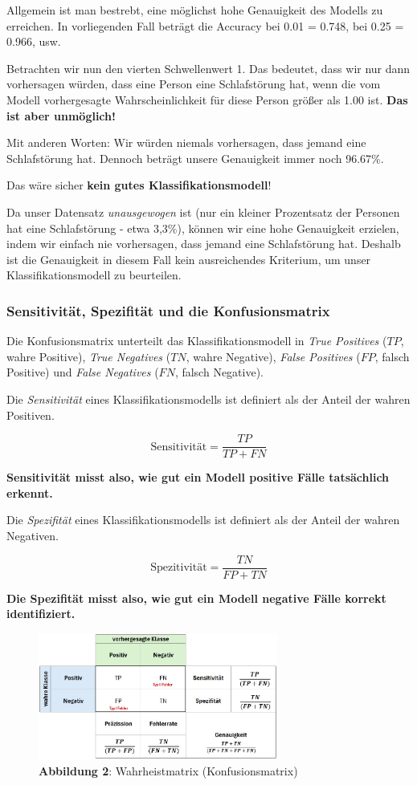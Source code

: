 \documentclass[
]{article}
\begin{document}
Allgemein ist man bestrebt, eine möglichst hohe Genauigkeit des Modells zu erreichen. In vorliegenden Fall beträgt die Accuracy bei 0.01 = 0.748, bei 0.25 = 0.966, usw.

Betrachten wir nun den vierten Schwellenwert 1. Das bedeutet, dass wir nur dann vorhersagen würden, dass eine Person eine Schlafstörung hat, wenn die vom Modell vorhergesagte Wahrscheinlichkeit für diese Person größer als 1.00 ist. \textbf{Das ist aber unmöglich!}

Mit anderen Worten: Wir würden niemals vorhersagen, dass jemand eine Schlafstörung hat. Dennoch beträgt unsere Genauigkeit immer noch 96.67\%.

Das wäre sicher \textbf{kein gutes Klassifikationsmodell}!

Da unser Datensatz \emph{unausgewogen} ist (nur ein kleiner Prozentsatz der Personen hat eine Schlafstörung - etwa 3,3\%), können wir eine hohe Genauigkeit erzielen, indem wir einfach nie vorhersagen, dass jemand eine Schlafstörung hat. Deshalb ist die Genauigkeit in diesem Fall kein ausreichendes Kriterium, um unser Klassifikationsmodell zu beurteilen.

\subsubsection{Sensitivität, Spezifität und die Konfusionsmatrix}\label{sensitivituxe4t-spezifituxe4t-und-die-konfusionsmatrix}

Die Konfusionsmatrix unterteilt das Klassifikationsmodell in \emph{True Positives} (\(TP\), wahre Positive), \emph{True Negatives} (\(TN\), wahre Negative), \emph{False Positives} (\(FP\), falsch Positive) und \emph{False Negatives} (\(FN\), falsch Negative).

Die \emph{Sensitivität} eines Klassifikationsmodells ist definiert als der Anteil der wahren Positiven.

\[\text{Sensitivität} = \frac{TP}{TP + FN}\]

\textbf{Sensitivität misst also, wie gut ein Modell positive Fälle tatsächlich erkennt.}

Die \emph{Spezifität} eines Klassifikationsmodells ist definiert als der Anteil der wahren Negativen.

\[\text{Spezitivität} = \frac{TN}{FP + TN}\]

\textbf{Die Spezifität misst also, wie gut ein Modell negative Fälle korrekt identifiziert.}

\begin{figure}
\centering
\includegraphics[width=0.7\textwidth,height=\textheight]{Images/Konfussionsmatrix.jpg}
\caption{\textbf{Abbildung 2}: Wahrheistmatrix (Konfusionsmatrix)}
\end{figure}
\end{document}
